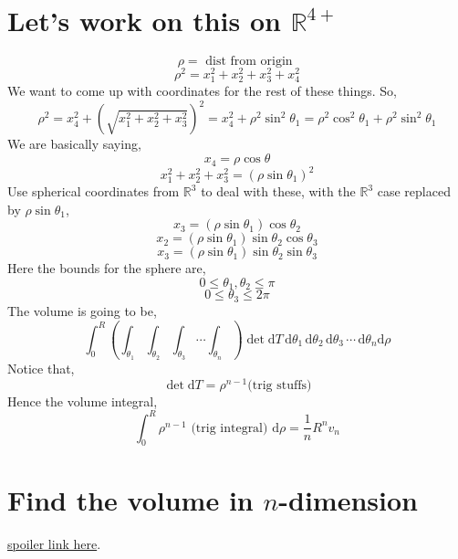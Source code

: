 \documentclass[letter]{article}
\begin{document}
\section*{Let's work on this on $\mathbb{R}^{4+}$} 
\[
\rho = \text{ dist from origin }
\]
\[
\rho^2 = x_1^2 + x_2^2 + x_3^2 + x_4^2
\]
We want to come up with coordinates for the rest of these things. So, 
\[
\rho^2 = x_4^2 + 
\left(\sqrt{x_1^2+ x_2^2 + x_3^2} \right)^2 = x_4^2 + \rho^2 \sin ^2 \theta_1 = \rho^2 \cos ^2 \theta_1 + \rho^2 \sin ^2 \theta_1
\] 
We are basically saying, 
\[
x_4 = \rho \cos \theta
\]
\[
x_1 ^2 + x_2 ^2 + x_3 ^2 = \left(\rho \sin \theta_1\right)^2
\] 
Use spherical coordinates from $\mathbb{R}^{3}$ to deal with these,  with the $\mathbb{R}^{3}$ case replaced by $ \rho \sin \theta_1$, 
\[
x_3 = \left(\rho \sin \theta_1\right) \cos \theta_2
\]
\[
x_2 = \left(\rho \sin \theta_1 \right) \sin \theta_2 \cos \theta_3
\]
\[
x_3 = \left(\rho \sin \theta_1\right) \sin \theta_2 \sin \theta_3
\] 
Here the bounds for the sphere are, 
\[
0 \le \theta_1 , \theta_2 \le  \pi
\]
\[
0 \le \theta_3 \le  2 \pi
\] 
The volume is going to be, 
\[
	\int_{0}^{R}  \left(\int_{\theta_1} \int_{\theta_2} \int_{\theta_3} \cdots \int_{\theta_n}\right)  \det \mathrm{d} T \, \mathrm{d} \theta_1 \, \mathrm{d} \theta_2 \, \mathrm{d} \theta_3 \, \cdots \, \mathrm{d} \theta_n \mathrm{d} \rho
\]
Notice that, 
\[
\det \mathrm{d} T = \rho^{n-1} \text{(trig stuffs)}
\] 
Hence the volume integral, 
\[
\int_{0}^{R} \rho^{n-1} \text{ (trig integral) } \mathrm{d} \rho = \frac{1}{n}R^{n} v_n
\] 

\section*{Find the volume in $n$-dimension} 
\href{https://scholar.rose-hulman.edu/cgi/viewcontent.cgi?article=1064&context=rhumj}{spoiler link here}. 

\end{document}
